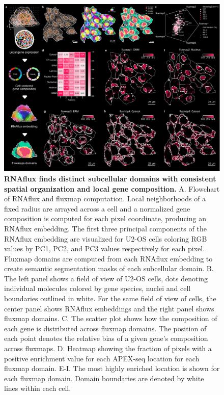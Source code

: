 \begin{figure}[p]
    \centering
    \includegraphics[width=\textwidth]{1_figures-and-files/Fig4.pdf}
    \caption[RNAflux finds distinct subcellular domains with consistent spatial organization and local gene composition.]{\textbf{RNAflux finds distinct subcellular domains with consistent spatial organization and local gene composition.} A. Flowchart of RNAflux and fluxmap computation. Local neighborhoods of a fixed radius are arrayed across a cell and a normalized gene composition is computed for each pixel coordinate, producing an RNAflux embedding. The first three principal components of the RNAflux embedding are visualized for U2-OS cells coloring RGB values by PC1, PC2, and PC3 values respectively for each pixel. Fluxmap domains are computed from each RNAflux embedding to create semantic segmentation masks of each subcellular domain. B. The left panel shows a field of view of U2-OS cells, dots denoting individual molecules colored by gene species, nuclei and cell boundaries outlined in white. For the same field of view of cells, the center panel shows RNAflux embeddings and the right panel shows fluxmap domains. C. The scatter plot shows how the composition of each gene is distributed across fluxmap domains. The position of each point denotes the relative bias of a given gene's composition across fluxmaps. D. Heatmap showing the fraction of pixels with a positive enrichment value for each APEX-seq location for each fluxmap domain.  E-I. The most highly enriched location is shown for each fluxmap domain. Domain boundaries are denoted by white lines within each cell.}
    \label{fig:4 RNAflux finds dinstinct subcellular domains}
\end{figure}

